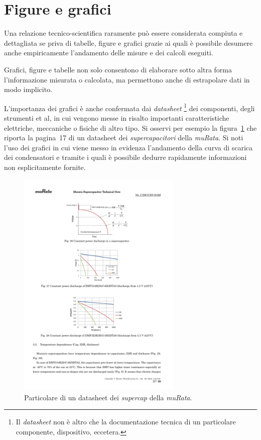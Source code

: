 			\section{Figure e grafici}

Una relazione tecnico-scientifica raramente può essere considerata compiuta e dettagliata se priva di tabelle, figure e grafici grazie ai quali è possibile desumere anche empiricamente l'andamento delle misure e dei calcoli eseguiti.

Grafici, figure e tabelle non solo consentono di elaborare sotto altra forma l'informazione misurata o calcolata, ma permettono anche di estrapolare dati in modo implicito.

L'importanza dei grafici è anche confermata dai \textit{datasheet}%
\footnote{Il \textit{datasheet} non è altro che la documentazione tecnica di un particolare componente, dispositivo, eccetera.}
dei componenti, degli strumenti et al, in cui vengono messe in risalto importanti caratteristiche elettriche, meccaniche o fisiche di altro tipo. Si osservi per esempio la figura~\ref{fig:datasheet} che riporta la pagina~17 di un datasheet dei \textit{supercapacitori} della {\sffamily\textit{muRata}}. Si noti l'uso dei grafici in cui viene messo in evidenza l'andamento della curva di scarica dei condensatori e tramite i quali è possibile dedurre rapidamente informazioni non esplicitamente fornite.

\begin{figure}[htb!]
\centering
    \includegraphics[width=0.7\textwidth]{figure/datasheet.pdf}%
    \caption{Particolare di un datasheet dei \textit{supercap} della {\sffamily\textit{muRata}}.}
    \label{fig:datasheet}
\end{figure}


